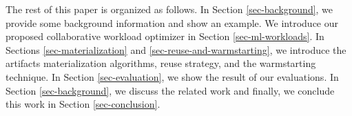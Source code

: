 The rest of this paper is organized as follows.
In Section \ref{sec-background}, we provide some background information and show an example.
We introduce our proposed collaborative workload optimizer in Section \ref{sec-ml-workloads}.
In Sections \ref{sec-materialization} and \ref{sec-reuse-and-warmstarting}, we introduce the artifacts materialization algorithms, reuse strategy, and the warmstarting technique. 
In Section \ref{sec-evaluation}, we show the result of our evaluations.
In Section \ref{sec-background}, we discuss the related work and finally, we conclude this work in Section \ref{sec-conclusion}.